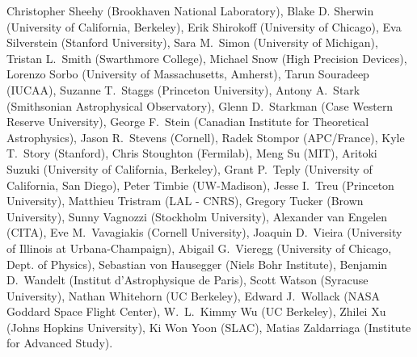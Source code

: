Christopher Sheehy (Brookhaven National Laboratory),
Blake D. Sherwin (University of California, Berkeley),
Erik Shirokoff (University of Chicago),
Eva Silverstein (Stanford University),
Sara M.~Simon (University of Michigan),
Tristan L.~Smith (Swarthmore College),
Michael Snow (High Precision Devices),
Lorenzo Sorbo (University of Massachusetts, Amherst),
Tarun Souradeep (IUCAA),
Suzanne T.~Staggs (Princeton University),
Antony A.~Stark (Smithsonian Astrophysical Observatory),
Glenn D.~Starkman (Case Western Reserve University),
George F.~Stein (Canadian Institute for Theoretical Astrophysics),
Jason R.~Stevens (Cornell),
Radek Stompor (APC/France),
Kyle T.~Story (Stanford),
Chris Stoughton (Fermilab),
Meng Su (MIT),
Aritoki Suzuki (University of California, Berkeley),
Grant P.~Teply (University of California, San Diego),
Peter Timbie (UW-Madison),
Jesse I.~Treu (Princeton University),
Matthieu Tristram (LAL - CNRS),
Gregory Tucker (Brown University),
Sunny Vagnozzi (Stockholm University),
Alexander van Engelen (CITA),
Eve M.~Vavagiakis (Cornell University),
Joaquin D.~Vieira (University of Illinois at Urbana-Champaign),
Abigail G.~Vieregg (University of Chicago, Dept. of Physics),
Sebastian von Hausegger (Niels Bohr Institute),
Benjamin D.~Wandelt (Institut d'Astrophysique de Paris),
Scott Watson (Syracuse University),
Nathan Whitehorn (UC Berkeley),
Edward J.~Wollack (NASA Goddard Space Flight Center),
W.~L.~Kimmy Wu (UC Berkeley),
Zhilei Xu (Johns Hopkins University),
Ki Won Yoon (SLAC),
Matias Zaldarriaga (Institute for Advanced Study).
